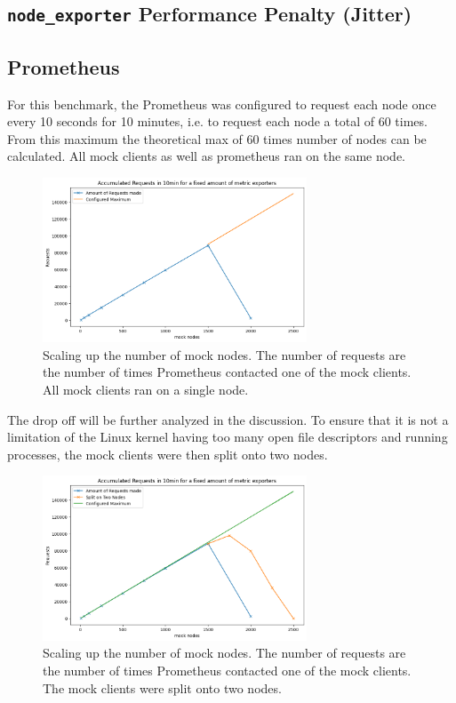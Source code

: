 \subsection{\texttt{node\_exporter} Performance Penalty (Jitter)}
\subsection{Prometheus}
For this benchmark, the Prometheus was configured to request each node once every 10 seconds for 10 minutes, i.e. to request each node a total of 60 times. From this maximum the theoretical max of 60 times number of nodes can be calculated. All mock clients as well as prometheus ran on the same node.

\begin{figure}[H]
  \centering
  \includegraphics[width=0.7\textwidth]{./plots/prometheus_1node.png}
  \caption{Scaling up the number of mock nodes. The number of requests are the number of times Prometheus contacted one of the mock clients. All mock clients ran on a single node.}
\end{figure}

The drop off will be further analyzed in the discussion. To ensure that it is not a limitation of the Linux kernel having too many open file descriptors and running processes, the mock clients were then split onto two nodes.

\begin{figure}[H]
  \centering
  \includegraphics[width=0.7\textwidth]{./plots/prometheus_2node.png}
  \caption{Scaling up the number of mock nodes. The number of requests are the number of times Prometheus contacted one of the mock clients. The mock clients were split onto two nodes.}
\end{figure}

